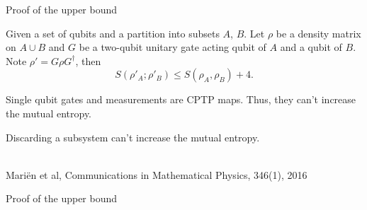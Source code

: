 \begin{frame}[c]{Proof of the upper bound}
  \hfill \\[1cm]
  \begin{itemize}
    \large
    \item  
    Given a set of qubits and a partition into subsets $A$, $B$.
    Let $\rho$ be a density matrix on $A \cup B$ and 
    $G$ be a two-qubit unitary gate acting qubit of $A$ and a qubit of $B$.
    Note $\rho' = G \rho G^\dag$, then
    \begin{equation*}
      S(\rho'_A ; \rho'_B) \leq S(\rho_A, \rho_B) + 4.
    \end{equation*}
     {
    \item
      Single qubit gates and measurements are CPTP maps. 
      Thus, they can't increase the mutual entropy.
    }
     {
    \item
      Discarding a subsystem can't increase the mutual entropy.
    }
  \end{itemize}

  \hfill\\[1.5cm]
  {\large \color{spingrey}
    Mariën et al, Communications in Mathematical Physics, 346(1), 2016
  }
\end{frame}


\begin{frame}[c]{Proof of the upper bound}
  \hfill \\[1cm]
  \Large
\end{frame}

